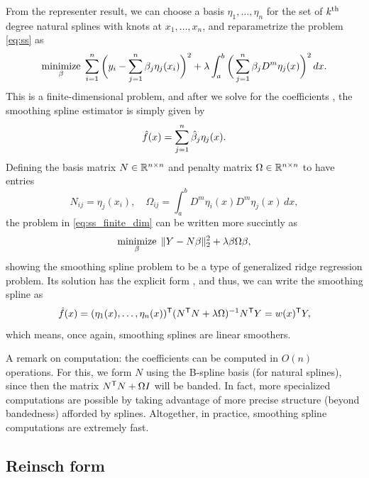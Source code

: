 \documentclass{article}
\begin{document}
From the representer result, we can choose a basis $\eta_1,\dots,\eta_n$ for the
set of $k^{\text{th}}$ degree natural splines with knots at $x_1,\dots,x_n$, and
reparametrize the problem \eqref{eq:ss} as  
\begin{equation}
\label{eq:ss_finite_dim}
\mathop{\mathrm{minimize}}_\beta \; \sum_{i=1}^n \bigg( y_i - \sum_{j=1}^n \beta_j \eta_j(x_i)
\bigg)^2 + \lambda \int_a^b \bigg( \sum_{j=1}^n \beta_j D^m \eta_j(x) \bigg)^2
\, dx.  
\end{equation}
This is a finite-dimensional problem, and after we solve for the coefficients
, the smoothing spline estimator is simply given by  
\[
\hat{f}(x)=\sum_{j=1}^n \hat{\beta}_j \eta_j(x).
\]
Defining the basis matrix $N \in \mathbb{R}^{n \times n}$ and penalty matrix $\Omega \in
\mathbb{R}^{n \times n}$ to have entries
\[
N_{ij} = \eta_j(x_i), \quad 
\Omega_{ij} = \int_a^b D^m \eta_i(x) D^m \eta_j(x) \, dx,
\]
the problem in \eqref{eq:ss_finite_dim} can be written more succintly as
\[
\mathop{\mathrm{minimize}}_\beta \; \|Y - N\beta\|_2^2 + \lambda \beta \Omega \beta,  
\]
showing the smoothing spline problem to be a type of generalized ridge
regression problem. Its solution has the explicit form , and thus, we can write the smoothing spline as   
\[
\hat{f}(x) = (\eta_1(x),\dots,\eta_n(x))^{\mathsf{T}} (N^{\mathsf{T}} N + \lambda \Omega)^{-1} N^{\mathsf{T}} Y =
w(x)^{\mathsf{T}} Y,   
\]
which means, once again, smoothing splines are linear smoothers.

A remark on computation: the coefficients  can be computed in $O(n)$ operations. For this, we form  
$N$ using the B-spline basis (for natural splines), since then the matrix $N^{\mathsf{T}}
N + \Omega I$ will be banded. In fact, more specialized computations are
possible by taking advantage of more precise structure (beyond bandedness)
afforded by splines. Altogether, in practice, smoothing spline computations are 
extremely fast. 

\subsection{Reinsch form}
\end{document}
